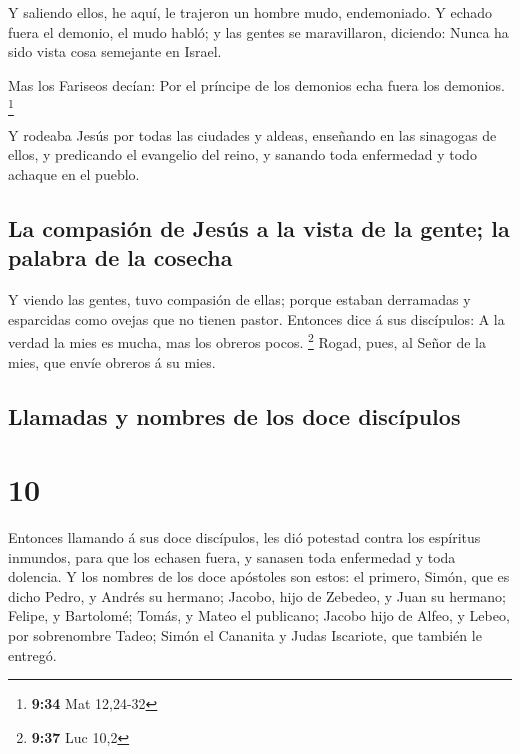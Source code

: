  Y saliendo ellos, he aquí, le trajeron un hombre mudo,
endemoniado.  Y echado fuera el demonio, el mudo habló; y
las gentes se maravillaron, diciendo: Nunca ha sido vista cosa semejante
en Israel.

 Mas los Fariseos decían: Por el príncipe de los demonios
echa fuera los demonios. \footnote{\textbf{9:34} Mat 12,24-32}

 Y rodeaba Jesús por todas las ciudades y aldeas,
enseñando en las sinagogas de ellos, y predicando el evangelio del
reino, y sanando toda enfermedad y todo achaque en el pueblo.

\hypertarget{la-compasiuxf3n-de-jesuxfas-a-la-vista-de-la-gente-la-palabra-de-la-cosecha}{%
\subsection{La compasión de Jesús a la vista de la gente; la palabra de
la
cosecha}\label{la-compasiuxf3n-de-jesuxfas-a-la-vista-de-la-gente-la-palabra-de-la-cosecha}}

 Y viendo las gentes, tuvo compasión de ellas; porque
estaban derramadas y esparcidas como ovejas que no tienen pastor.
 Entonces dice á sus discípulos: A la verdad la mies es
mucha, mas los obreros pocos. \footnote{\textbf{9:37} Luc 10,2}
 Rogad, pues, al Señor de la mies, que envíe obreros á su
mies.

\hypertarget{llamadas-y-nombres-de-los-doce-discuxedpulos}{%
\subsection{Llamadas y nombres de los doce
discípulos}\label{llamadas-y-nombres-de-los-doce-discuxedpulos}}

\hypertarget{section-9}{%
\section{10}\label{section-9}}

 Entonces llamando á sus doce discípulos, les dió potestad
contra los espíritus inmundos, para que los echasen fuera, y sanasen
toda enfermedad y toda dolencia.  Y los nombres de los
doce apóstoles son estos: el primero, Simón, que es dicho Pedro, y
Andrés su hermano; Jacobo, hijo de Zebedeo, y Juan su hermano;
 Felipe, y Bartolomé; Tomás, y Mateo el publicano; Jacobo
hijo de Alfeo, y Lebeo, por sobrenombre Tadeo;  Simón el
Cananita y Judas Iscariote, que también le entregó.

